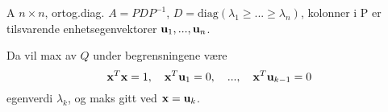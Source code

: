 A $n\times n$,
ortog.diag. $A=PDP^{-1}$,
$D=\text{diag}(\lambda_1\geq ...\geq\lambda_n)$,
kolonner i P er tilsvarende enhetsegenvektorer $\mathbf{u}_1, ..., \mathbf{u}_n$.

Da vil max av $Q$ under begrensningene være
$$\mathbf{x}^T\mathbf{x}=1, \quad \mathbf{x}^T\mathbf{u}_1=0,
  \quad ..., \quad \mathbf{x}^T\mathbf{u}_{k-1}=0$$
egenverdi $\lambda_k$, og maks gitt ved $\mathbf{x} = \mathbf{u}_k$.
